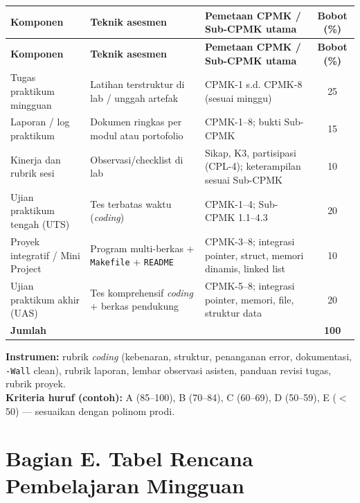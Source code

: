 \documentclass[12pt,a4paper]{article}
\begin{document}
\begin{longtable}{|>{\raggedright\arraybackslash}p{3cm}|>{\raggedright\arraybackslash}p{4.2cm}|>{\raggedright\arraybackslash}p{5.8cm}|c|}
\hline
\textbf{Komponen} & \textbf{Teknik asesmen} & \textbf{Pemetaan CPMK / Sub-CPMK utama} & \textbf{Bobot (\%)} \\
\hline
\endfirsthead
\hline
\textbf{Komponen} & \textbf{Teknik asesmen} & \textbf{Pemetaan CPMK / Sub-CPMK utama} & \textbf{Bobot (\%)} \\
\hline
\endhead
\hline
\endfoot

Tugas praktikum mingguan & Latihan terstruktur di lab / unggah artefak & CPMK-1 s.d. CPMK-8 (sesuai minggu) & 25 \\
\hline
Laporan / log praktikum & Dokumen ringkas per modul atau portofolio & CPMK-1--8; bukti Sub-CPMK & 15 \\
\hline
Kinerja dan rubrik sesi & Observasi/checklist di lab & Sikap, K3, partisipasi (CPL-4); keterampilan sesuai Sub-CPMK & 10 \\
\hline
Ujian praktikum tengah (UTS) & Tes terbatas waktu (\textit{coding}) & CPMK-1--4; Sub-CPMK 1.1--4.3 & 20 \\
\hline
Proyek integratif / Mini Project & Program multi-berkas + \texttt{Makefile} + \texttt{README} & CPMK-3--8; integrasi pointer, struct, memori dinamis, linked list & 10 \\
\hline
Ujian praktikum akhir (UAS) & Tes komprehensif \textit{coding} + berkas pendukung & CPMK-5--8; integrasi pointer, memori, file, struktur data & 20 \\
\hline
\textbf{Jumlah} & & & \textbf{100} \\
\hline
\end{longtable}

\noindent\textbf{Instrumen:} rubrik \textit{coding} (kebenaran, struktur, penanganan error, dokumentasi, \texttt{-Wall} clean), rubrik laporan, lembar observasi asisten, panduan revisi tugas, rubrik proyek.\\
\noindent\textbf{Kriteria huruf (contoh):} A (85--100), B (70--84), C (60--69), D (50--59), E ($<$50) --- sesuaikan dengan polinom prodi.

\vspace{0.75cm}

\section*{Bagian E. Tabel Rencana Pembelajaran Mingguan}
\end{document}
